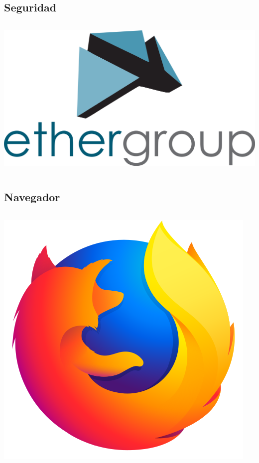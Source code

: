 \subsection{Seguridad}
\begin{frame}
    \begin{columns}
            \includegraphics[width=\textwidth]{logo_EtherGroup.png}
    \end{columns}
\end{frame}

\subsection{Navegador}
\begin{frame}
    \begin{columns}
            \includegraphics[width=\textwidth]{Firefox_Logo_2017.png}
    \end{columns}
\end{frame}

